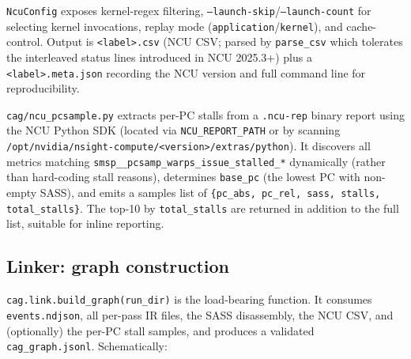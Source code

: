 \documentclass[10pt]{article}
\begin{document}
\texttt{NcuConfig} exposes kernel-regex filtering, \texttt{--launch-skip}/\texttt{--launch-count} for selecting kernel invocations, replay mode (\texttt{application}/\texttt{kernel}), and cache-control. Output is \texttt{<label>.csv} (NCU CSV; parsed by \texttt{parse\_csv} which tolerates the interleaved status lines introduced in NCU 2025.3+) plus a \texttt{<label>.meta.json} recording the NCU version and full command line for reproducibility.

\texttt{cag/ncu\_pcsample.py} extracts per-PC stalls from a \texttt{.ncu-rep} binary report using the NCU Python SDK (located via \texttt{NCU\_REPORT\_PATH} or by scanning \texttt{/opt/nvidia/nsight-compute/<version>/extras/python}). It discovers all metrics matching \texttt{smsp\_\_pcsamp\_warps\_issue\_stalled\_*} dynamically (rather than hard-coding stall reasons), determines \texttt{base\_pc} (the lowest PC with non-empty SASS), and emits a samples list of \texttt{\{pc\_abs, pc\_rel, sass, stalls, total\_stalls\}}. The top-10 by \texttt{total\_stalls} are returned in addition to the full list, suitable for inline reporting.

\subsection{Linker: graph construction}\label{sec:linker}

\texttt{cag.link.build\_graph(run\_dir)} is the load-bearing function. It consumes \texttt{events.ndjson}, all per-pass IR files, the SASS disassembly, the NCU CSV, and (optionally) the per-PC stall samples, and produces a validated \texttt{cag\_graph.jsonl}. Schematically:
\end{document}
